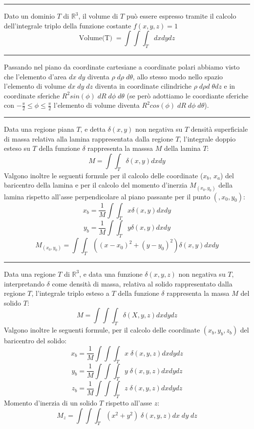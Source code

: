 \rule{\textwidth}{0,4pt}\newline
\begin{tcolorbox}
Dato un dominio $T$ di $\mathbb{R}^3$, il volume di $T$ può essere espresso  tramite il calcolo dell'integrale triplo della funzione costante $f(x,y,z) = 1$
\[
    \text{Volume(T)}\; = \int \int \int_{T} dx dy dz
\]
\end{tcolorbox}
\rule{\textwidth}{0,4pt}
\begin{tcolorbox}
Passando nel piano da coordinate cartesiane a coordinate polari abbiamo visto che l'elemento d'area $dx \; dy$ diventa $\rho \; d \rho \;d \theta$, allo stesso modo nello spazio l'elemento di volume $dx \; dy \; dz$ diventa in coordinate cilindriche $\rho\; d \rho d \;\theta dz$ e in coordinate sferiche $R^2 sin(\phi)\; dR \;d \phi \;d \theta$ (se però adottiamo le coordiante sferiche con $-\frac{\pi}{2} \leq \phi \leq \frac{\pi}{2}$ l'elemento di volume diventa $R^2 cos(\phi) \;dR \;d \phi \;d \theta$).
\end{tcolorbox}
\rule{\textwidth}{0,4pt}\newline
\begin{tcolorbox}
Data una regione piana $T$, e detta $\delta (x,y)$ non negativa su $T$ densità superficiale di massa relativa alla lamina rappresentata dalla regione $T$, l'integrale doppio esteso su $T$ della funzione $\delta$ rappresenta la masssa $M$ della lamina $T$:
\[
    M = \int \int_{T} \delta(x,y) dx dy
\]
Valgono inoltre le seguenti formule per il calcolo delle coordinate ($x_b$, $x_a$) del baricentro della lamina e per il calcolo del momento d'inerzia $M_{(x_0, y_0)}$ della lamina rispetto all'asse perpendicolare al piano passante per il punto $(,x_0, y_0)$:
\[
    x_b = \frac{1}{M}\int \int_{T} x \delta(x,y)dxdy
\]
\[
    y_b= \frac{1}{M} \int \int_{T} y \delta(x,y)dxdy
\]
\[
    M_{(x_0, y_0)} = \int \int_{T}((x-x_0)^2 + (y-y_0)^2) \delta(x,y) dxdy
\]
\end{tcolorbox}
\rule{\textwidth}{0,4pt}\newline
\begin{tcolorbox}
Data una regione $T$ di $\mathbb{R}^3$, e data una funzione $\delta(x,y,z)$ non negativa su $T$, interpretando $\delta$ come densità di massa, relativa al solido rappresentato dalla regione $T$, l'integrale triplo esteso a $T$ della funzione $\delta$ rappresenta la massa $M$ del solido $T$:
\[
    M = \int \int \int_{T} \delta(X,y,z)dx dy dz
\]
Valgono inoltre le seguenti formule, per il calcolo delle coordinate $(x_b, y_b, z_b)$ del baricentro del solido:
\[
    x_b = \frac{1}{M} \int \int \int_{T} x \; \delta(x,y,z) dx dy dz
\]
\[
    y_b = \frac{1}{M} \int \int \int_{T} y \; \delta(x,y,z)dx dy dz
\]
\[
    z_b = \frac{1}{M} \int \int \int_{T} z \; \delta(x,y,z)dx dy dz
\]
Momento d'inerzia di un solido $T$ rispetto all'asse $z$:
\[
    M_z = \int \int \int_{T} (x^2+y^2) \; \delta(x,y,z) dx \; dy \; dz
\]
\end{tcolorbox}
